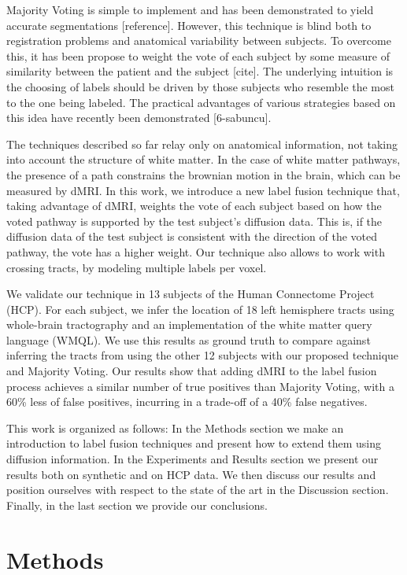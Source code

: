 Majority Voting is simple to implement and has been demonstrated to yield
accurate segmentations [reference]. However, this technique is blind both to
registration problems and anatomical variability between subjects. To overcome
this, it has been propose to weight the vote of each subject by some measure of
similarity between the patient and the subject [cite]. The underlying
intuition is the choosing of labels should be driven by those subjects who
resemble the most to the one being labeled. The practical advantages of various
strategies based on this idea have recently been demonstrated [6-sabuncu].

The techniques described so far relay only on anatomical information, not taking 
into account the structure of white matter. In the case of white matter pathways,
the presence of a path constrains the brownian motion in the brain, which can be
measured by dMRI. In this work, we introduce a new label fusion technique that,
taking advantage of dMRI, weights the vote of each subject based on how the voted
pathway is supported by the test subject's diffusion data. This is, if the
diffusion data of the test subject is consistent with the direction of the voted
pathway, the vote has a higher weight. Our technique also allows to work with
crossing tracts, by modeling multiple labels per voxel.

We validate our technique in 13 subjects of the Human Connectome Project (HCP).
For each subject, we infer the location of 18 left hemisphere tracts using
whole-brain tractography and an implementation of the white matter query language
(WMQL). We use this results as ground truth to compare against inferring the
tracts from using the other 12 subjects with our proposed technique and Majority
Voting. Our results show that adding dMRI to the label fusion process achieves a
similar number of true positives than Majority Voting, with a 60\% less of
false positives, incurring in a trade-off of a 40\% false negatives.

This work is organized as follows: In the Methods section we make an introduction
to label fusion techniques and present how to extend them using diffusion
information. In the Experiments and Results section we present our results 
both on synthetic and on HCP data. We then discuss our results and position
ourselves with respect to the state of the art in the Discussion section. 
Finally, in the last section we provide our conclusions.

\section{Methods}

